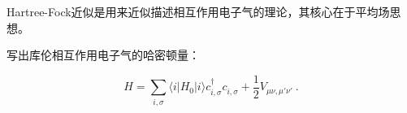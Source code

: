 
Hartree-Fock近似是用来近似描述相互作用电子气的理论，其核心在于平均场思想。

写出库伦相互作用电子气的哈密顿量：

$$H=\sum\limits_{i,\sigma}\langle i|H_0|i\rangle c_{i,\sigma}^\dagger c_{i,\sigma}^~+\frac{1}{2}V_{\mu \nu,\mu' \nu'}~. $$
